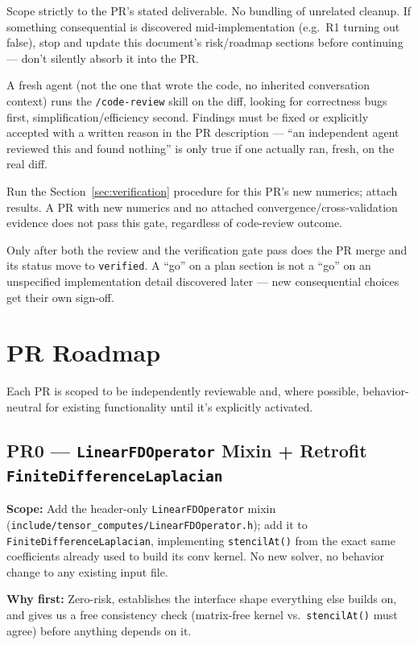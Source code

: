 \documentclass[11pt]{article}
\newcommand{\pr}[2]{\subsection{PR#1 --- #2}}
\begin{document}
\begin{description}[leftmargin=*,style=nextline]
\item[Implement] Scope strictly to the PR's stated deliverable. No bundling
of unrelated cleanup. If something consequential is discovered
mid-implementation (e.g.\ R1 turning out false), stop and update this
document's risk/roadmap sections before continuing --- don't silently absorb
it into the PR.
\item[Independent reviewer agent] A fresh agent (not the one that wrote the
code, no inherited conversation context) runs the \texttt{/code-review}
skill on the diff, looking for correctness bugs first,
simplification/efficiency second. Findings must be fixed or explicitly
accepted with a written reason in the PR description --- ``an independent
agent reviewed this and found nothing'' is only true if one actually ran,
fresh, on the real diff.
\item[Physics verification gate] Run the Section~\ref{sec:verification}
procedure for this PR's new numerics; attach results. A PR with new
numerics and no attached convergence/cross-validation evidence does not
pass this gate, regardless of code-review outcome.
\item[Merge / go-no-go] Only after both the review and the verification
gate pass does the PR merge and its status move to \texttt{verified}. A
``go'' on a plan section is not a ``go'' on an unspecified implementation
detail discovered later --- new consequential choices get their own
sign-off.
\end{description}

\section{PR Roadmap}
\label{sec:roadmap}

Each PR is scoped to be independently reviewable and, where possible,
behavior-neutral for existing functionality until it's explicitly
activated.

\pr{0}{\texttt{LinearFDOperator} Mixin + Retrofit \texttt{FiniteDifferenceLaplacian}}
\textbf{Scope:} Add the header-only \texttt{LinearFDOperator} mixin
(\texttt{include/tensor\_computes/LinearFDOperator.h}); add it to
\texttt{FiniteDifferenceLaplacian}, implementing \texttt{stencilAt()} from
the exact same coefficients already used to build its conv kernel. No new
solver, no behavior change to any existing input file.

\textbf{Why first:} Zero-risk, establishes the interface shape everything
else builds on, and gives us a free consistency check (matrix-free kernel
vs.\ \texttt{stencilAt()} must agree) before anything depends on it.
\end{document}
